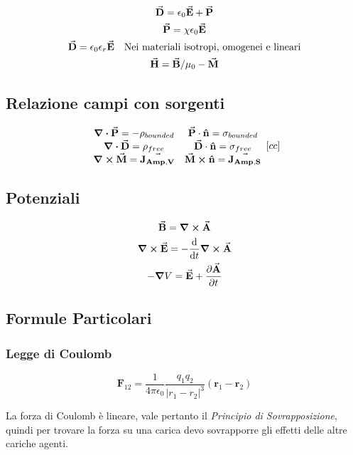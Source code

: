 \documentclass[a4paper]{scrarticle}
\begin{document}
\begin{gather}
    \va D = \epsilon_0 \va E + \va P\\
    \va P = \chi\epsilon_0 \va E \\
    \va D = \epsilon_0 \epsilon_r \va E \quad \text{Nei materiali isotropi, omogenei e lineari}\\
    \va H = \va B/\mu_0 - \va M
\end{gather}

\subsection{Relazione campi con sorgenti}
\[
\begin{array}{cc}
    \div {\va P} = - \rho_{bounded} &
    \va P \cdot  \vu n = \sigma_{bounded}\\
    \div {\va D} = \rho_{free} &
    \va D \cdot  \vu n = \sigma_{free}\\
    \curl {\va M} = \va {J_{Amp, V}} &
    \va M \cross \vu n = \va {J_{Amp, S}}
\end{array}[cc]
\]

\subsection{Potenziali}

\begin{gather}
    \va B = \curl{\va A} \\
    \curl{\va E} = -\dv{t}\curl{\va A}\\
    -\grad{V} = \va E + \pdv{\va A}{t}
\end{gather}

\subsection{Formule Particolari}

\subsubsection*{Legge di Coulomb}

\begin{equation}
    \bm F_{12} = \frac{1}{4\pi\epsilon_0}\frac{q_1 q_2}{|r_1 - r_2|^3}(\bm r_1 - \bm r_2)
\end{equation}

La forza di Coulomb è lineare, vale pertanto il \emph{Principio di Sovrapposizione}, quindi per trovare la forza su una carica devo sovrapporre gli effetti delle altre cariche agenti.
\end{document}
